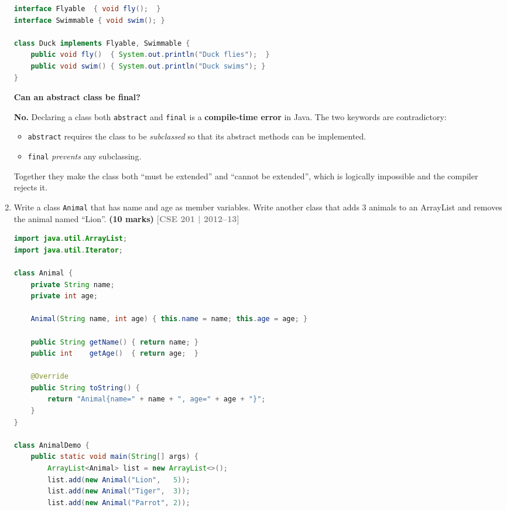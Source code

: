 \documentclass[12pt,a3paper]{article}
\newcommand{\yr}[1]{\hfill\textcolor{gray}{\small\textbf{[#1]}}}
\newcommand{\mk}[1]{\textcolor{orange!70!black}{\small\textbf{(#1 marks)}}}
\begin{document}
\begin{enumerate}
\begin{tcolorbox}
\begin{lstlisting}[language=Java]
interface Flyable  { void fly();  }
interface Swimmable { void swim(); }

class Duck implements Flyable, Swimmable {
    public void fly()  { System.out.println("Duck flies");  }
    public void swim() { System.out.println("Duck swims"); }
}
\end{lstlisting}

\medskip
\textbf{Can an abstract class be final?}

\textbf{No.} Declaring a class both \texttt{abstract} and \texttt{final}
is a \textbf{compile-time error} in Java. The two keywords are
contradictory:
\begin{itemize}[itemsep=2pt]
  \item \texttt{abstract} requires the class to be \emph{subclassed}
  so that its abstract methods can be implemented.
  \item \texttt{final} \emph{prevents} any subclassing.
\end{itemize}
Together they make the class both ``must be extended'' and ``cannot be
extended'', which is logically impossible and the compiler rejects it.
\end{tcolorbox}

\item Write a class \texttt{Animal} that has name and age as member variables. Write another class that adds 3 animals to an ArrayList and removes the animal named ``Lion''. \mk{10}
\yr{CSE 201 | 2012--13}

\begin{tcolorbox}[enhanced,breakable,ansbox,
  colback=cC!4,colframe=cC,boxrule=0.8pt,arc=5pt,
  title={\textbf{Answer --- Animal Class with ArrayList}},
  fonttitle=\bfseries\color{white},colbacktitle=cC]
\begin{lstlisting}[language=Java]
import java.util.ArrayList;
import java.util.Iterator;

class Animal {
    private String name;
    private int age;

    Animal(String name, int age) { this.name = name; this.age = age; }

    public String getName() { return name; }
    public int    getAge()  { return age;  }

    @Override
    public String toString() {
        return "Animal{name=" + name + ", age=" + age + "}";
    }
}

class AnimalDemo {
    public static void main(String[] args) {
        ArrayList<Animal> list = new ArrayList<>();
        list.add(new Animal("Lion",   5));
        list.add(new Animal("Tiger",  3));
        list.add(new Animal("Parrot", 2));


\end{lstlisting}
\end{tcolorbox}
\end{enumerate}
\end{document}
